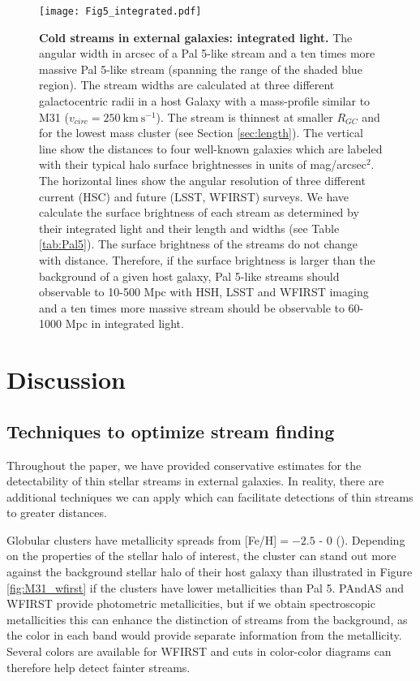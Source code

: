 \documentclass[twocolumn]{aastex62}
\newcommand{\kms}{\ensuremath{\textrm{km}~\textrm{s}^{-1}}}
\begin{document}
\begin{figure}
\centerline{\texttt{[image: Fig5\_integrated.pdf]}}
\caption{{\bf Cold streams in external galaxies: integrated light.} The angular width in arcsec of a Pal 5-like stream and a ten times more massive Pal 5-like stream (spanning the range of the shaded blue region). The stream widths are calculated at three different galactocentric radii in a host Galaxy with a mass-profile similar to M31 ($v_{circ} = 250 ~\kms$). The stream is thinnest at smaller $R_{GC}$ and for the lowest mass cluster (see Section \ref{sec:length}). The vertical line show the distances to four well-known galaxies which are labeled with their typical halo surface brightnesses in units of mag/arcsec$^2$. The horizontal lines show the angular resolution of three different current (HSC) and future (LSST, WFIRST) surveys. We have calculate the surface brightness of each stream as determined by their integrated light and their length and widths (see Table \ref{tab:Pal5}). The surface brightness of the streams do not change with distance. Therefore, if the surface brightness is larger than the background of a given host galaxy,  Pal 5-like streams should observable to 10-500 Mpc with HSH, LSST and WFIRST imaging and a ten times more massive stream should be observable to 60-1000 Mpc in integrated light. }
\label{fig:int}
\end{figure}


\section{Discussion}
\label{sec:discussion}

\subsection{Techniques to optimize stream finding}
\label{sec:color}
Throughout the paper, we have provided conservative estimates for the detectability of thin stellar streams in external galaxies. In reality, there are additional techniques we can apply which can facilitate detections of thin streams to greater distances. 

Globular clusters have metallicity spreads from [Fe/H]$ = -2.5$ - 0 (\citealt{harris96}). Depending on the properties of the stellar halo of interest, the cluster can stand out more against the background stellar halo of their host galaxy than illustrated in Figure \ref{fig:M31_wfirst} if the clusters have lower metallicities than Pal 5. PAndAS and WFIRST provide photometric metallicities, but if we obtain spectroscopic metallicities this can enhance the distinction of streams from the background, as the color in each band would provide separate information from the metallicity. Several colors are available for WFIRST and cuts in color-color diagrams can therefore help detect fainter streams. 
\end{document}
